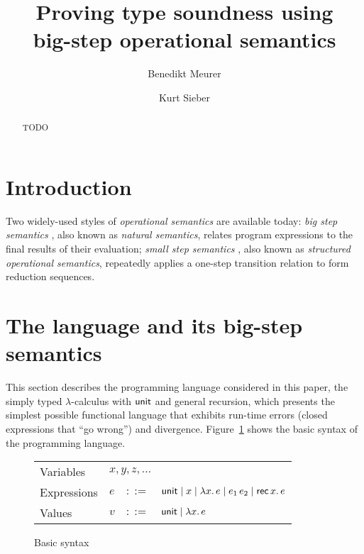 \documentclass[12pt,a2paper,draft]{article}
\newcommand{\abstr}[2]{\ensuremath{\lambda{#1}.\,{#2}}}
\newcommand{\app}[2]{\ensuremath{{#1}\,{#2}}}
\newcommand{\rec}[2]{\ensuremath{{\normalfont\textsf{rec}}\,{#1}.\,{#2}}}
\newcommand{\unit}{\ensuremath{\normalfont\textsf{unit}}}
\begin{document}
\title{%
  Proving type soundness using\\big-step operational semantics
}
\author{Benedikt Meurer}
\author{Kurt Sieber}
\date{}
\maketitle
\begin{abstract}
  TODO
\end{abstract}


\section{Introduction}

Two widely-used styles of \emph{operational semantics} are available today: \emph{big step semantics} \cite{Kahn87},
also known as \emph{natural semantics}, relates program expressions to the final results of their
evaluation; \emph{small step semantics} \cite{Plotkin81,Plotkin04}, also known as
\emph{structured operational semantics}, repeatedly applies a one-step transition relation to
form reduction sequences.


\section{The language and its big-step semantics}

This section describes the programming language considered in this paper,
the simply typed $\lambda$-calculus with $\unit$ and general recursion, which
presents the simplest possible functional language that exhibits run-time
errors (closed expressions that ``go wrong'') and divergence. Figure~\ref{fig:Basic_syntax}
shows the basic syntax of the programming language.

\begin{figure}[htb]
  \centering
  \begin{tabular}{llcl}
    Variables   & \multicolumn{3}{l}{$x,y,z,\ldots$} \\
    Expressions & $e$ & $::=$ & $\unit \mid x \mid \abstr{x}{e} \mid \app{e_1}{e_2} \mid \rec{x}{e}$ \\
    Values      & $v$ & $::=$ & $\unit \mid \abstr{x}{e}$
  \end{tabular}
  \caption{Basic syntax}
  \label{fig:Basic_syntax}
\end{figure}
\end{document}

